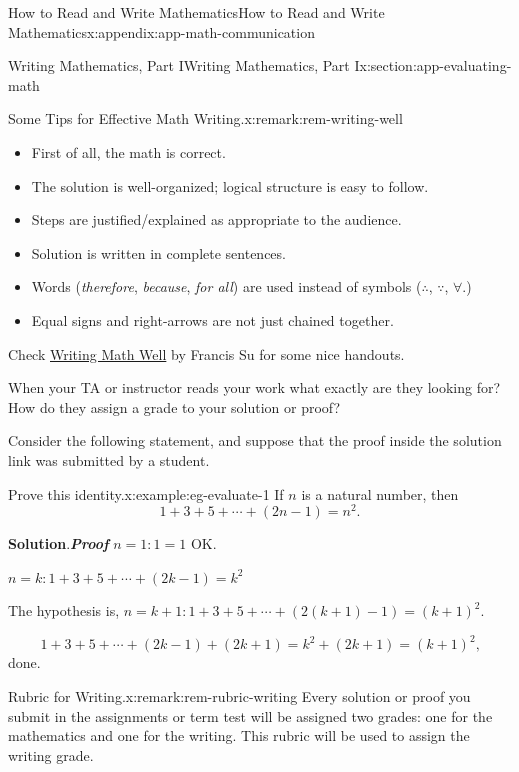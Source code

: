 \documentclass[oneside,10pt,]{book}
\newcommand{\blocktitlefont}{\relax}
\newcommand{\alert}[1]{\textbf{\textit{#1}}}
\numberwithin{equation}{section}
\begin{document}
\begin{appendixptx}{How to Read and Write Mathematics}{}{How to Read and Write Mathematics}{}{}{x:appendix:app-math-communication}
\begin{sectionptx}{Writing Mathematics, Part I}{}{Writing Mathematics, Part I}{}{}{x:section:app-evaluating-math}
\begin{remark}{Some Tips for Effective Math Writing.}{x:remark:rem-writing-well}
%
\begin{itemize}[label=\textbullet]
\item{}First of all, the math is correct.%
\item{}The solution is well-organized; logical structure is easy to follow.%
\item{}Steps are justified\slash{}explained as appropriate to the audience.%
\item{}Solution is written in complete sentences.%
\item{}Words (\emph{therefore}, \emph{because}, \emph{for all}) are used instead of symbols (\(\therefore\), \(\because\), \(\forall\).)%
\item{}Equal signs and right-arrows are not just chained together.%
\end{itemize}
Check \href{https://math.hmc.edu/su/writing-math-well/}{Writing Math Well} by Francis Su for some nice handouts.%
\end{remark}
When your TA or instructor reads your work what exactly are they looking for? How do they assign a grade to your solution or proof?%
\par
Consider the following statement, and suppose that the proof inside the solution link was submitted by a student.%
\begin{example}{Prove this identity.}{x:example:eg-evaluate-1}%
If \(n\) is a natural number, then%
\begin{equation*}
1 + 3 + 5 + \cdots + (2n-1) = n^2\text{.}
\end{equation*}
%
\par\smallskip%
\noindent\textbf{\blocktitlefont Solution}.\hypertarget{g:solution:id553222}{}\quad{}\alert{Proof} \(n = 1: 1 = 1\) OK.%
\par
\(n = k: 1 + 3 + 5 + \cdots + (2k-1) = k^2\)%
\par
The hypothesis is, \(n = k + 1: 1 + 3 + 5 + \cdots + (2(k+1) - 1) = (k+1)^2\).%
\par
%
\begin{equation*}
1 + 3 + 5 + \cdots + (2k-1) + (2k+1) = k^2 + (2k + 1) = (k+1)^2\text{,}
\end{equation*}
done.%
\end{example}
\begin{remark}{Rubric for Writing.}{x:remark:rem-rubric-writing}%
Every solution or proof you submit in the assignments or term test will be assigned two grades: one for the mathematics and one for the writing. This rubric will be used to assign the writing grade.%
\par

\end{remark}
\end{sectionptx}
\end{appendixptx}
\end{document}
